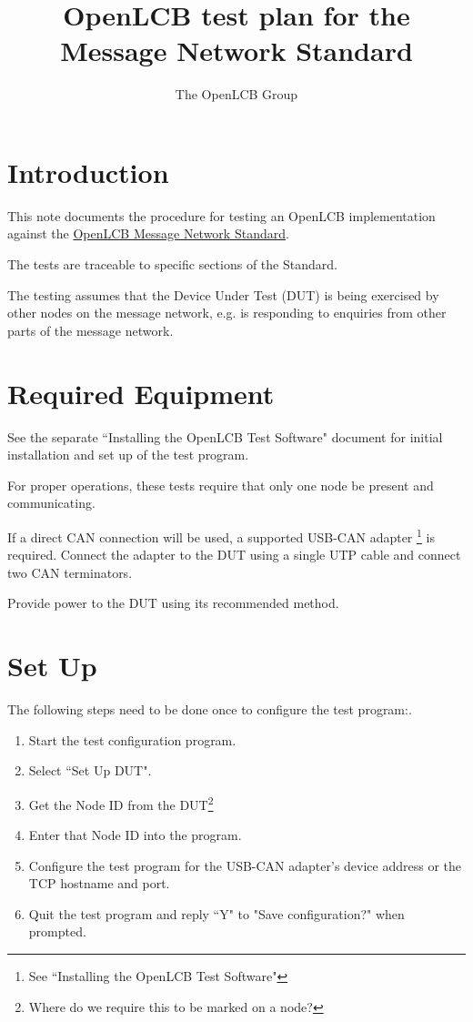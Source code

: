 \documentclass[11pt]{article}
\title{OpenLCB test plan for the Message Network Standard}
\author{The OpenLCB Group}
\begin{document}
\maketitle


\section{Introduction}

This note documents the procedure for testing an OpenLCB implementation against the
\href{https://nbviewer.org/github/openlcb/documents/blob/master/standards/MessageNetworkS.pdf}
    {OpenLCB Message Network Standard}.

The tests are traceable to specific sections of the Standard.

The testing assumes that the Device Under Test (DUT) is being exercised by other
nodes on the message network, 
e.g. is responding to enquiries from other parts of the message network.

\section{Required Equipment}

See the separate ``Installing the OpenLCB Test Software" document for initial installation 
and set up of the test program.

For proper operations, these tests require that only one node be present and communicating.

If a direct CAN connection will be used,
a supported USB-CAN adapter
    \footnote{See ``Installing the OpenLCB Test Software"}
is required. 
Connect the adapter to the DUT using a single UTP cable and connect two CAN terminators.

Provide power to the DUT using its recommended method.

\section{Set Up}
The following steps need to be done once to configure the test program:.
\begin{enumerate}
\item Start the test configuration program. 
\item Select ``Set Up DUT".
\item Get the Node ID from the DUT\footnote{Where do we require this to be marked on a node?} 
\item Enter that Node ID into the program.
\item Configure the test program for the USB-CAN adapter's device address
        or the TCP hostname and port.
\item Quit the test program and reply ``Y" to "Save configuration?" when prompted.
\end{enumerate}
\end{document}
